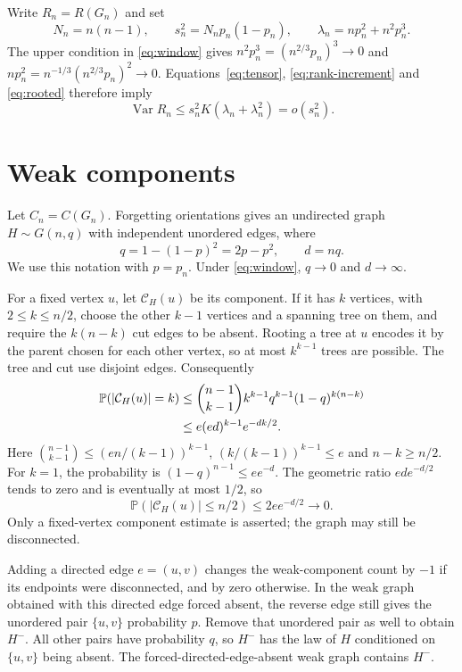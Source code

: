 \documentclass[11pt]{article}
\newcommand{\Var}{\operatorname{Var}}
\begin{document}
Write $R_n=R(G_n)$ and set
\begin{equation}\label{eq:scale}
 N_n=n(n-1),\qquad s_n^2=N_np_n(1-p_n),\qquad
 \lambda_n=np_n^2+n^2p_n^3.
\end{equation}
The upper condition in \eqref{eq:window} gives
$n^2p_n^3=(n^{2/3}p_n)^3\to0$ and
$np_n^2=n^{-1/3}(n^{2/3}p_n)^2\to0$.
Equations~\eqref{eq:tensor}, \eqref{eq:rank-increment} and \eqref{eq:rooted} therefore imply
\begin{equation}\label{eq:rank-var}
 \Var R_n\le s_n^2K(\lambda_n+\lambda_n^2)=o(s_n^2).
\end{equation}

\section{Weak components}

Let $C_n=C(G_n)$. Forgetting orientations gives an undirected graph $H\sim G(n,q)$ with independent unordered edges, where
\[
 q=1-(1-p)^2=2p-p^2,\qquad d=nq.
\]
We use this notation with $p=p_n$. Under \eqref{eq:window}, $q\to0$ and $d\to\infty$.

For a fixed vertex $u$, let $\mathcal C_H(u)$ be its component. If it has $k$ vertices, with $2\le k\le n/2$, choose the other $k-1$ vertices and a spanning tree on them, and require the $k(n-k)$ cut edges to be absent. Rooting a tree at $u$ encodes it by the parent chosen for each other vertex, so at most $k^{k-1}$ trees are possible. The tree and cut use disjoint edges. Consequently
\begin{align}
 \mathbb P(|\mathcal C_H(u)|=k)
 &\le \binom{n-1}{k-1}k^{k-1}q^{k-1}(1-q)^{k(n-k)}\notag\\
 &\le e(ed)^{k-1}e^{-dk/2}.
 \label{eq:component-size}
\end{align}
Here $\binom{n-1}{k-1}\le(en/(k-1))^{k-1}$,
$(k/(k-1))^{k-1}\le e$ and $n-k\ge n/2$.
For $k=1$, the probability is $(1-q)^{n-1}\le e e^{-d}$. The geometric ratio $ed e^{-d/2}$ tends to zero and is eventually at most $1/2$, so
\begin{equation}\label{eq:small-component}
 \mathbb P(|\mathcal C_H(u)|\le n/2)\le2e e^{-d/2}\longrightarrow0.
\end{equation}
Only a fixed-vertex component estimate is asserted; the graph may still be disconnected.

Adding a directed edge $e=(u,v)$ changes the weak-component count by $-1$ if its endpoints were disconnected, and by zero otherwise. In the weak graph obtained with this directed edge forced absent, the reverse edge still gives the unordered pair $\{u,v\}$ probability $p$. Remove that unordered pair as well to obtain $H^-$. All other pairs have probability $q$, so $H^-$ has the law of $H$ conditioned on $\{u,v\}$ being absent. The forced-directed-edge-absent weak graph contains $H^-$.
\end{document}
